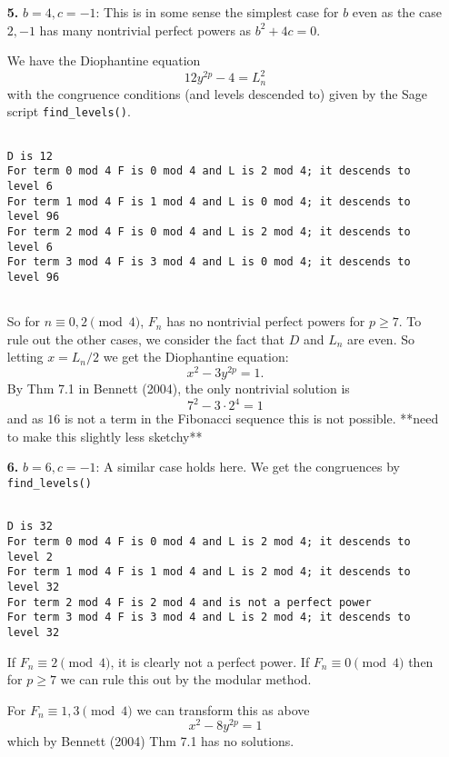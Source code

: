 \documentclass[12pt]{article}
\begin{document}
\begin{enumerate}

\item[\textbf{5.}] $b = 4, c = -1$: This is in some sense the simplest case for $b$ even as the case $2, -1$ has many nontrivial perfect powers as $b^2+4c = 0$.

We have the Diophantine equation
\[ 12y^{2p} - 4 = L_n^2 \]
with the congruence conditions (and levels descended to) given by the Sage script \texttt{find\_levels()}.

\begin{lstlisting}

D is 12
For term 0 mod 4 F is 0 mod 4 and L is 2 mod 4; it descends to level 6
For term 1 mod 4 F is 1 mod 4 and L is 0 mod 4; it descends to level 96
For term 2 mod 4 F is 0 mod 4 and L is 2 mod 4; it descends to level 6
For term 3 mod 4 F is 3 mod 4 and L is 0 mod 4; it descends to level 96


\end{lstlisting}

So for $n \equiv 0, 2 \pmod{4}$, $F_n$ has no nontrivial perfect powers for $p \geq 7$.  To rule out the other cases, we consider the fact that $D$ and $L_n$ are even.  So letting $x = L_n/2$ we get the Diophantine equation:
\[ x^2 - 3y^{2p} = 1. \]
By Thm 7.1 in Bennett (2004), the only nontrivial solution is 
\[ 7^2 -3 \cdot 2^4 = 1\]
and as $16$ is not a term in the Fibonacci sequence this is not possible.  **need to make this slightly less sketchy**


\item[\textbf{6.}] $b = 6, c = -1$: A similar case holds here.  We get the congruences by \texttt{find\_levels()}

\begin{lstlisting}

D is 32
For term 0 mod 4 F is 0 mod 4 and L is 2 mod 4; it descends to level 2
For term 1 mod 4 F is 1 mod 4 and L is 2 mod 4; it descends to level 32
For term 2 mod 4 F is 2 mod 4 and is not a perfect power
For term 3 mod 4 F is 3 mod 4 and L is 2 mod 4; it descends to level 32

\end{lstlisting}

If $F_n \equiv 2 \pmod{4}$, it is clearly not a perfect power.  If $F_n \equiv 0 \pmod{4}$ then for $p \geq 7$ we can rule this out by the modular method.

For $F_n \equiv 1, 3 \pmod{4}$ we can transform this as above
\[ x^2 - 8y^{2p} = 1 \]
which by Bennett (2004) Thm 7.1 has no solutions.


\end{enumerate}
\end{document}
